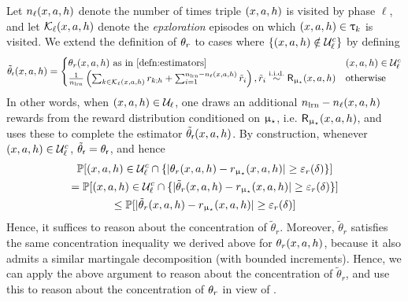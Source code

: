 Let $n_{\ell}(x,a,h)$ denote the number of times triple $(x,a,h)$ is visited by phase $\ell$, and let $\mathcal{K}_{\ell}(x,a,h)$ denote the \emph{epxloration} episodes on which $(x,a,h) \in {\uptau}_{k}$ is visited. We extend the definition of $\theta_r$ to cases where $\{(x,a,h) \notin \mathcal{U}_{\ell}^c\}$ by defining
\begin{align*}
\tilde{\theta}_{\sfr}\xah = \begin{cases} \thetar\xah \text{ as in   \Cref{defn:estimators}} & \xah \in \calU_{\ell}^c \\
\frac{1}{\nlearn}\left(\sum_{k\in \calK_{\ell}\xah}r_{k;h} + \sum_{i=1}^{\nlearn - n_{\ell}\xah} \tilde{r}_i\right),  \tilde{r}_i \iidsim \mathsf{R}_{\modst}\xah & \text{otherwise}
\end{cases}
\end{align*}
In other words, when $(x,a,h) \in \mathcal{U}_{\ell}$, one draws an additional $n_{\mathrm{lrn}} - n_{\ell}(x,a,h)$ rewards from the reward distribution conditioned on $\upmu_{\star}$, i.e. $\mathsf{R}_{\upmu_{\star}}(x,a,h) $, and uses these to complete the estimator $\tilde{\theta}_{\mathsf{r}}(x,a,h)$. By construction, whenever $(x,a,h) \in \mathcal{U}_{\ell}^c$, $\tilde{\theta}_{\mathsf{r}} = \theta_{\mathsf{r}}$, and hence
\begin{multline}
\operatorname{\mathbb{P}}[(x,a,h) \in \mathcal{U}_{\ell}^c \cap \{|\theta_r(x,a,h) - r_{\upmu_{\star}}(x,a,h)| \ge \varepsilon_{r}(\delta)\} ] \\
 = \operatorname{\mathbb{P}}[(x,a,h) \in \mathcal{U}_{\ell}^c \cap \{|\tilde{\theta}_r(x,a,h) - r_{\upmu_{\star}}(x,a,h)| \ge \varepsilon_{r}(\delta)\} ] \\
 \le \operatorname{\mathbb{P}}[|\tilde{\theta}_r(x,a,h) - r_{\upmu_{\star}}(x,a,h)| \ge \varepsilon_{r}(\delta) ] \label{eq:in_view_of}
\end{multline}
Hence, it suffices to reason about the concentration of $\tilde{\theta}_r$. Moreover, $\tilde{\theta}_r$ satisfies the same concentration inequality we derived above for $\theta_r(x,a,h)$, because it also admits a similar martingale decomposition (with bounded increments). Hence, we can apply the above argument to reason about the concentration of $\tilde{\theta}_r$, and use this to reason about the concentration of $\theta_r$ in view of .

\begin{comment}
We also define the censoring operator on ledgers and sequences of trajectories in the natural way:  $\cens(\traj_{\pi;1:m}) = (\cens(\traj_{\pi;1},\dots,\traj_{\pi;m}))$, and given a ledger $\ledger \in \ledgespacetotm$ as a collection policy-trajectory pairs $(\pi,\traj_{\pi;1:m}))_{\pi \in \Pi_{\ledger}}$, we set $\cens(\ledger) := (\pi,\cens(\traj_{\pi;1:m}))_{\pi \in \Pi_{\ledger}}$. Lastly, we define an ``inverse'' of the censoring operator $\censinv: \ledgespacecenstotm \to \subsets(\ledgespacetotm)$ via
\begin{align}
\censinv(\ledgecens) := \{\ledger \in \ledgespacetotm: \cens(\ledger) = \ledgecens\}
\end{align}
\end{comment}





